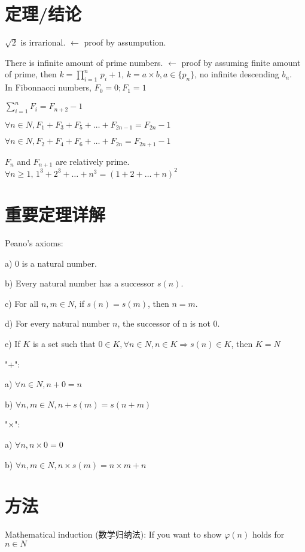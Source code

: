 \documentclass[12pt,a4paper]{ctexrep}
\begin{document}
\section{定理/结论}
$\sqrt 2$ is irrarional. $\leftarrow$ proof by assumpution.

There is infinite amount of prime numbers. $\leftarrow$ proof by assuming finite amount of prime, then $k = \prod_{i=1}^{n}\, p_{i} + 1$, $k = a \times b, a \in \{p_{n}\}$, no infinite descending {$b_{n}$}.\\

\noindent In Fibonnacci numbers, $F_{0} = 0; F_{1} = 1$

$\sum_{i = 1}^{n} F_{i} = F_{n+2}-1$

$\forall n \in N, F_{1}+F_{3}+F_{5}+\dots +F_{2n-1} = F_{2n}-1$

$\forall n \in N, F_{2}+F_{4}+F_{6}+\dots +F_{2n} = F_{2n+1}-1$

$F_{n}$ and $F_{n+1}$ are relatively prime.\\

\noindent $\forall n \geq 1, \, 1^{3}+2^{3}+\dots + n^{3} = (1+2+ \dots +n)^{2}$
\section{重要定理详解}
\noindent Peano's axioms: 

a) 0 is a natural number. 

b) Every natural number has a successor $s(n)$. 

c) For all $n,m \in N$, if $s(n) = s(m)$, then $n = m$. 

d) For every natural number $n$, the successor of n is not 0. 

e) If $K$ is a set such that $0 \in K, \forall n \in N, n \in K \Rightarrow s(n) \in K$, then $K = N$

\noindent "+":

a) $\forall n \in N, n+0 = n$

b) $\forall n,m \in N, n+s(m) = s(n+m)$

\noindent "$\times$":

a) $\forall n, n\times 0 = 0$

b) $\forall n,m \in N, n \times s(m) = n \times m + n$
\section{方法}
\noindent Mathematical induction (数学归纳法): If you want to show $\varphi(n)$ holds for $n \in N$ 
\end{document}

